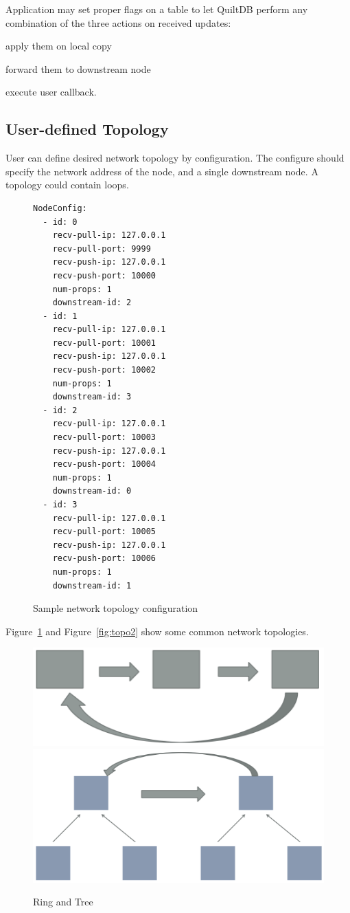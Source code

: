 \documentclass[11pt, twocolumn]{article}
\begin{document}
Application may set proper flags on a table to let QuiltDB perform any
combination of the three actions on received updates:
\begin{enumerate*}
\item apply them on local copy
\item forward them to downstream node
\item execute user callback.
\end{enumerate*}

\subsection{User-defined Topology}

User can define desired network topology by configuration. The configure should
specify the network address of the node, and a single downstream node. A topology could
contain loops.

\begin{figure}[th!]
  \centering
\begin{lstlisting}
NodeConfig:
  - id: 0
    recv-pull-ip: 127.0.0.1
    recv-pull-port: 9999
    recv-push-ip: 127.0.0.1
    recv-push-port: 10000
    num-props: 1
    downstream-id: 2
  - id: 1
    recv-pull-ip: 127.0.0.1
    recv-pull-port: 10001
    recv-push-ip: 127.0.0.1
    recv-push-port: 10002
    num-props: 1
    downstream-id: 3
  - id: 2
    recv-pull-ip: 127.0.0.1
    recv-pull-port: 10003
    recv-push-ip: 127.0.0.1
    recv-push-port: 10004
    num-props: 1
    downstream-id: 0
  - id: 3
    recv-pull-ip: 127.0.0.1
    recv-pull-port: 10005
    recv-push-ip: 127.0.0.1
    recv-push-port: 10006
    num-props: 1
    downstream-id: 1
\end{lstlisting}
  \caption{Sample network topology configuration}
\end{figure}

Figure~\ref{fig:topo1} and Figure~\ref{fig:topo2} show some common network
topologies.

\begin{figure}[th!]
  \centering
  \includegraphics[width=.4\textwidth]{fig/ring}
  \hspace{4ex}
  \includegraphics[width=.4\textwidth]{fig/tree}
  \caption{Ring and Tree}
  \label{fig:topo1}
\end{figure}
\end{document}
